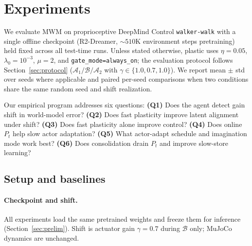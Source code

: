 
\section{Experiments}
\label{sec:experiments}

We evaluate MWM on proprioceptive DeepMind Control \texttt{walker-walk} with a single offline checkpoint (R2-Dreamer, ${\sim}510$K environment steps pretraining) held fixed across all test-time runs.
Unless stated otherwise, plastic uses $\eta=0.05$, $\lambda_0=10^{-3}$, $\mu=2$, and \texttt{gate\_mode=always\_on}; the evaluation protocol follows Section~\ref{sec:protocol} ($\mathcal{A}_1/\mathcal{B}/\mathcal{A}_2$ with $\gamma \in \{1.0, 0.7, 1.0\}$).
We report mean $\pm$ std over seeds where applicable and paired per-seed comparisons when two conditions share the same random seed and shift realization.

Our empirical program addresses six questions:
\textbf{(Q1)} Does the agent detect gain shift in world-model error?
\textbf{(Q2)} Does fast plasticity improve latent alignment under shift?
\textbf{(Q3)} Does fast plasticity alone improve control?
\textbf{(Q4)} Does online $P_t$ help slow actor adaptation?
\textbf{(Q5)} What actor-adapt schedule and imagination mode work best?
\textbf{(Q6)} Does consolidation drain $P_t$ and improve slow-store learning?

\subsection{Setup and baselines}
\label{sec:exp-setup}

\paragraph{Checkpoint and shift.}
All experiments load the same pretrained weights and freeze them for inference (Section~\ref{sec:prelim}).
Shift is actuator gain $\gamma=0.7$ during $\mathcal{B}$ only; MuJoCo dynamics are unchanged.

